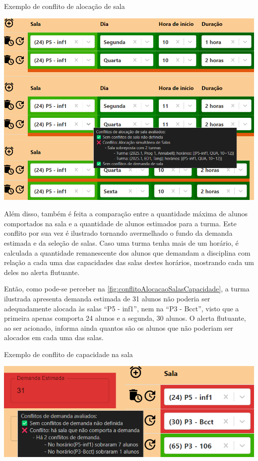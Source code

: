 \begin{MyCenteredFigure} \caption{Exemplo de conflito de alocação de sala} \label{fig:conflitoAlocacaoSalas}
  \includegraphics[width=\textwidth]{files/img/2.02!5-desenvolvimento/2.02!5.1.5-conflitos/Alocação de Salas - Sala}
\end{MyCenteredFigure}

Além disso, também é feita a comparação entre a quantidade máxima de alunos comportados na sala e a quantidade de alunos estimados para a turma. Este conflito por sua vez é ilustrado tornando avermelhado o fundo da demanda estimada e da seleção de salas. Caso uma turma tenha mais de um horário, é calculada a quantidade remanescente dos alunos que demandam a disciplina com relação a cada uma das capacidades das salas destes horários, mostrando cada um deles no alerta flutuante.

Então, como pode-se perceber na \autoref{fig:conflitoAlocacaoSalasCapacidade}, a turma ilustrada apresenta demanda estimada de 31 alunos não poderia ser adequadamente alocada às salas ``P5 - inf1'', nem na ``P3 - Bcct'', visto que a primeira apenas comporta 24 alunos e a segunda, 30 alunos. O alerta flutuante, ao ser acionado, informa ainda quantos são os alunos que não poderiam ser alocados em cada uma das salas.

\begin{MyCenteredFigure} \caption{Exemplo de conflito de capacidade na sala} \label{fig:conflitoAlocacaoSalasCapacidade}
  \includegraphics[width=\textwidth]{files/img/2.02!5-desenvolvimento/2.02!5.1.5-conflitos/Demanda X Capacidade}
\end{MyCenteredFigure}

